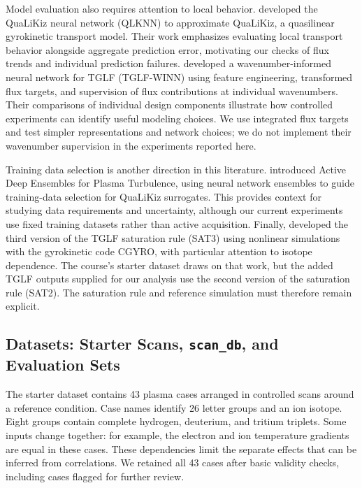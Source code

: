 \documentclass[12pt,letterpaper]{article}
\begin{document}
Model evaluation also requires attention to local behavior.
\citet{vandeplassche2020} developed the QuaLiKiz neural network (QLKNN)
to approximate QuaLiKiz, a quasilinear gyrokinetic transport model. Their work emphasizes evaluating local transport
behavior alongside aggregate prediction error, motivating our checks of flux
trends and individual prediction failures.
\citet{cao2026} developed a wavenumber-informed neural network for TGLF
(TGLF-WINN) using feature engineering, transformed
flux targets, and supervision of flux contributions at individual
wavenumbers. Their comparisons of individual design components illustrate
how controlled experiments can identify useful modeling choices. We use
integrated flux targets and test simpler representations and network choices;
we do not implement their wavenumber supervision in the experiments reported here.

Training data selection is another direction in this literature.
\citet{zanisi2024} introduced Active Deep Ensembles for Plasma Turbulence,
using neural network ensembles to guide training-data selection for QuaLiKiz
surrogates. This provides context for studying data requirements and
uncertainty, although our current experiments use fixed training datasets
rather than active acquisition. Finally, \citet{dudding2022} developed the
third version of the TGLF saturation rule (SAT3) using nonlinear
simulations with the gyrokinetic code CGYRO, with particular
attention to isotope dependence. The course's starter dataset draws on that
work, but the added TGLF outputs supplied for our analysis use the second
version of the saturation rule (SAT2). The
saturation rule and reference simulation must therefore remain explicit.

\subsection{Datasets: Starter Scans, \texttt{scan\_db}, and Evaluation Sets}

The starter dataset contains 43 plasma cases arranged in controlled scans
around a reference condition. Case names identify 26 letter groups and an ion
isotope. Eight groups contain complete hydrogen, deuterium, and tritium
triplets. Some inputs change together: for example, the electron and ion
temperature gradients are equal in these cases. These dependencies limit the
separate effects that can be inferred from correlations. We retained all 43
cases after basic validity checks, including cases flagged for further review.
\end{document}
